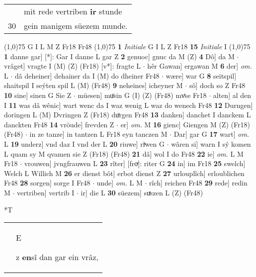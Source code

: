 \documentclass[8pt,a4paper,notitlepage]{article}
\begin{document}
\begin{table}[ht]
\begin{minipage}[t]{0.5\linewidth}
\begin{tabular}{rl}
 & mit rede vertriben \textbf{ir} stunde\\ 
30 & gein manigem süezem munde.\\ 
\end{tabular}
\scriptsize
\line(1,0){75} \newline
G I L M Z Fr18 Fr48 \newline
\line(1,0){75} \newline
\textbf{1} \textit{Initiale} G I L Z Fr18  \textbf{15} \textit{Initiale} I  \newline
\line(1,0){75} \newline
\textbf{1} danne gar] [*]: Gar I danne L gar Z \textbf{2} genuoc] gnuc da M (Z) \textbf{4} Dô] da M  $\cdot$ vrâget] vragte I (M) (Z) (Fr18) [v*]: fragte  L  $\cdot$ hêr Gawan] ergawan M \textbf{6} der] \textit{om.} L  $\cdot$ dâ deheiner] dehainer da I (M) do dheiner Fr48  $\cdot$ wære] war G \textbf{8} seitspil] shaitspil I seýten spil L (M) (Fr48) \textbf{9} neheines] icheyner M  $\cdot$ sô] doch so Z Fr48 \textbf{10} sine] sinen G Sie Z  $\cdot$ müesen] muͦsin G (I) (Z) (Fr48) mvͤse Fr18  $\cdot$ alten] al den I \textbf{11} was dâ wênic] wart wenc da I waz wenig L waz do wenech Fr48 \textbf{12} Durngen] doringen L (M) Dvringen Z (Fr18) duͦrgen Fr48 \textbf{13} danken] danchet I danckem L danckten Fr48 \textbf{14} vröude] frevden Z  $\cdot$ er] \textit{om.} M \textbf{16} gienc] Giengen M (Z) (Fr18) (Fr48)  $\cdot$ in ze tanze] in tantzen L Fr18 eyn tanczen M  $\cdot$ Dar] gar G \textbf{17} wart] \textit{om.} L \textbf{19} underz] vnd daz I vnd der L \textbf{20} riuwe] riͮwen G  $\cdot$ wâren si] warn I sý komen L quam sy M qvamen sie Z (Fr18) (Fr48) \textbf{21} dâ] wol I do Fr48 \textbf{22} ie] \textit{om.} L M Fr18  $\cdot$ vrouwen] jvngfrauwen L \textbf{23} rîter] [froͮ]: riter G \textbf{24} in] im Fr18 \textbf{25} swelch] Welch L Willich M \textbf{26} er dienst bôt] erbot dienst Z \textbf{27} urlouplîch] erloublichen Fr48 \textbf{28} sorgen] sorge I Fr48  $\cdot$ unde] \textit{om.} L M  $\cdot$ rîch] reichen Fr48 \textbf{29} rede] redin M  $\cdot$ vertriben] vertrib I  $\cdot$ ir] die L \textbf{30} süezem] suͯszen L (Z) (Fr48) \newline
\end{minipage}
\hspace{0.5cm}
\begin{minipage}[t]{0.5\linewidth}
\small
\begin{center}*T
\end{center}
\begin{tabular}{rl}
 & \begin{large}E\end{large}z \textbf{en}sî dan gar ein vrâz,\\ 

\end{tabular}
\end{minipage}
\end{table}
\end{document}
